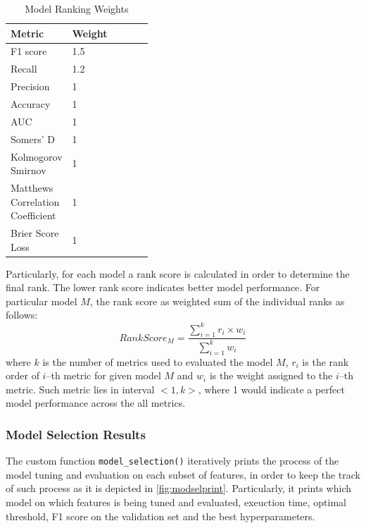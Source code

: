 \begin{table}[H]
\small
\setlength{\tabcolsep}{8pt}
\renewcommand{\arraystretch}{1.3}
\centering
    \caption[Model Ranking Weights]{Model Ranking Weights}\label{tab:weightsrank}
    \begin{tabular}{>{\raggedleft\arraybackslash}p{0.4\linewidth} l}
\toprule
\textbf{Metric} & \textbf{Weight}\\
\midrule
\hline
F1 score & 1.5 \\
Recall & 1.2 \\
Precision & 1 \\
Accuracy & 1 \\
AUC & 1 \\
Somers' D & 1 \\ 
Kolmogorov Smirnov & 1 \\
Matthews Correlation Coefficient  & 1 \\
Brier Score Loss  & 1 \\
\hline
\bottomrule
\end{tabular}
\vspace{0.7em}

\vspace{-1em}
\end{table}

Particularly, for each model a rank score is calculated in order to determine the final rank. The lower rank score indicates better model performance. For particular model $M$, the rank score as weighted sum of the individual ranks as follows:
\begin{equation}\label{eq:rankscorem}
    RankScore_{M} = \frac{\sum_{i=1}^{k} {r_i \times w_i}}{\sum_{i=1}^{k} {w_i}} 
\end{equation}
where $k$ is the number of metrics used to evaluated the model $M$, $r_i$ is the rank order of $i$--th metric for given model $M$ and $w_i$ is the weight assigned to the $i$--th metric.
Such metric lies in interval $<1, k>$, where 1 would indicate a perfect model performance across the all metrics.

\subsubsection{Model Selection Results}



The custom function \lstinline{model_selection()} iteratively prints the process of the model tuning and evaluation on each subset of features, in order to keep the track of such process as it is depicted in \autoref{fig:modselprint}.
Particularly, it prints which model on which features is being tuned and evaluated, exeuction time, optimal threshold, F1 score on the validation set and the best hyperparameters.

